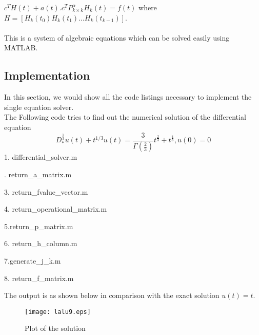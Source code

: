 $c^TH(t) + a(t) . c^T P_{k \times k}^\alpha H_k(t) = f(t)$
where $H=[H_k(t_0) H_k(t_1) ... H_k(t_{k-1})]$. \\~\\
This is a system of algebraic equations which can be solved easily using MATLAB.
\newpage
 \subsection{Implementation}
 In this section, we would show all the code listings necessary to implement the single equation solver.\\
 The Following code tries to find out the numerical solution of the differential equation
 \begin{equation*}
 D_*^{\frac{1}{3}}u(t)+t^{1/3}u(t)=\frac{3}{\Gamma{(\frac{2}{3})}}t^{\frac{2}{3}}+t^{\frac{4}{3}} , u(0)=0
 \end{equation*}
 1. differential\_solver.m\\
 {\selectfont }
 
 . return\_a\_matrix.m \\
  {\selectfont }
  
  3. return\_fvalue\_vector.m
   {\selectfont }
 
 4. return\_operational\_matrix.m
  {\selectfont \footnotesize{}}
 
 \newpage
 
 5.return\_p\_matrix.m
  {\selectfont \footnotesize{}}
  
  6. return\_h\_column.m
   {\selectfont \footnotesize{}}
   
 7.generate\_j\_k.m
  {\selectfont \footnotesize{}}
\newpage

8. return\_f\_matrix.m
 {\selectfont \footnotesize{}}
 
 The output is as shown below in comparison with the exact solution $u(t)=t$.
 \\
 \begin{figure}[h]

\centering

    \texttt{[image: lalu9.eps]}

    \caption{Plot of the solution}

\end{figure} 

